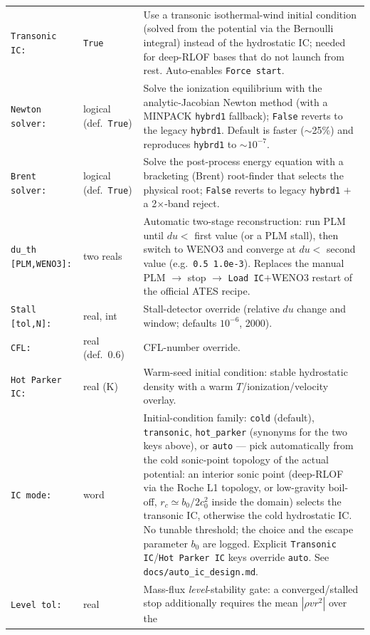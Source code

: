 \documentclass[english,a4paper]{kiseon_memo}
\begin{document}
\begin{longtable}{@{}p{}p{}p{}@{}}
\texttt{Transonic IC:} & \texttt{True} & Use a transonic isothermal-wind initial
  condition (solved from the potential via the Bernoulli integral) instead of the
  hydrostatic IC; needed for deep-RLOF bases that do not launch from rest.
  Auto-enables \texttt{Force start}. \\
\texttt{Newton solver:} & logical (def.\ \texttt{True}) & Solve the ionization
  equilibrium with the analytic-Jacobian Newton method (with a MINPACK
  \texttt{hybrd1} fallback); \texttt{False} reverts to the legacy \texttt{hybrd1}.
  Default is faster ($\sim$25\%) and reproduces \texttt{hybrd1} to $\sim10^{-7}$. \\
\texttt{Brent solver:} & logical (def.\ \texttt{True}) & Solve the post-process
  energy equation with a bracketing (Brent) root-finder that selects the physical
  root; \texttt{False} reverts to legacy \texttt{hybrd1} $+$ a 2$\times$-band
  reject. \\
\texttt{du\_th [PLM,WENO3]:} & two reals & Automatic two-stage reconstruction:
  run PLM until $du<$ first value (or a PLM stall), then switch to WENO3 and
  converge at $du<$ second value (e.g.\ \texttt{0.5 1.0e-3}). Replaces the manual
  PLM $\to$ stop $\to$ \texttt{Load IC}$+$WENO3 restart of the official ATES
  recipe. \\
\texttt{Stall [tol,N]:} & real, int & Stall-detector override (relative $du$
  change and window; defaults $10^{-6}$, 2000). \\
\texttt{CFL:} & real (def.\ 0.6) & CFL-number override. \\
\texttt{Hot Parker IC:} & real (K) & Warm-seed initial condition: stable
  hydrostatic density with a warm $T$/ionization/velocity overlay. \\
\texttt{IC mode:} & word & Initial-condition family:
  \texttt{cold} (default), \texttt{transonic}, \texttt{hot\_parker}
  (synonyms for the two keys above), or \texttt{auto} --- pick
  automatically from the cold sonic-point topology of the actual
  potential: an interior sonic point (deep-RLOF via the Roche L1
  topology, or low-gravity boil-off, $r_c\simeq b_0/2c_0^2$ inside the
  domain) selects the transonic IC, otherwise the cold hydrostatic IC.
  No tunable threshold; the choice and the escape parameter $b_0$ are
  logged. Explicit \texttt{Transonic IC}/\texttt{Hot Parker IC} keys
  override \texttt{auto}. See \texttt{docs/auto\_ic\_design.md}. \\
\texttt{Level tol:} & real & Mass-flux \emph{level}-stability gate: a
  converged/stalled stop additionally requires the mean $|\rho v r^2|$ over the

\end{longtable}
\end{document}
